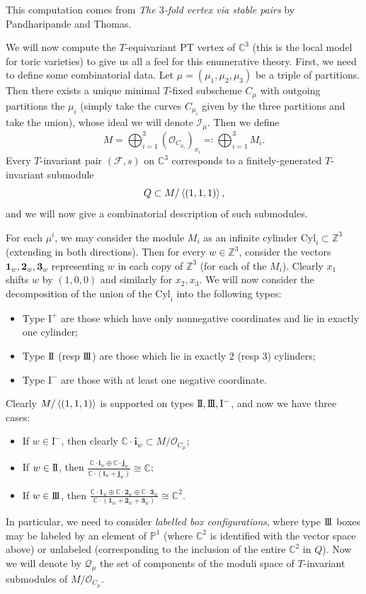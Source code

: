 \documentclass{amsart}
\theoremstyle{definition}
\theoremstyle{remark}
\theoremstyle{plain}
\theoremstyle{definition}
\theoremstyle{remark}
\newcommand{\C}{\mathbb{C}}
\newcommand{\Z}{\mathbb{Z}}
\renewcommand{\P}{\mathbb{P}}
\newcommand{\mc}[1]{\mathcal{#1}}
\newcommand{\mr}[1]{\mathrm{#1}}
\newcommand{\1}{\mathbf{1}}
\newcommand{\2}{\mathbf{2}}
\newcommand{\3}{\mathbf{3}}
\newcommand{\I}{\mathrm{I}}
\newcommand{\II}{\mr{I}\hspace{-1.3pt}\mr{I}}
\newcommand{\III}{\mr{I}\hspace{-1.3pt}\mr{I}\hspace{-1.3pt}\mr{I}}
\begin{document}
This computation comes from \textit{The $3$-fold vertex via stable pairs} by Pandharipande and Thomas.

We will now compute the $T$-equivariant PT vertex of $\C^3$ (this is the local model for toric varieties) to give us all a feel for this enumerative theory. First, we need to define some combinatorial data. Let $\mu = (\mu_1, \mu_2, \mu_3)$ be a triple of partitions. Then there exists a unique minimal $T$-fixed subscheme $C_{\mu}$ with outgoing partitions the $\mu_i$ (simply take the curves $C_{\mu_i}$ given by the three partitions and take the union), whose ideal we will denote $\mc{I}_{\mu}$. Then we define
\[ M = \bigoplus_{i=1}^3 {(\mc{O}_{C_{\mu_i}})}_{x_i} \eqqcolon \bigoplus_{i=1}^3 M_i. \]
Every $T$-invariant pair $(\mc{F}, s)$ on $\C^3$ corresponds to a finitely-generated $T$-invariant submodule
\[ Q \subset M/\ev{(1,1,1)}, \]
and we will now give a combinatorial description of such submodules.

For each $\mu^i$, we may consider the module $M_i$ as an infinite cylinder $\mr{Cyl}_i \subset \Z^3$ (extending in both directions). Then for every $w \in \Z^3$, consider the vectors $\1_w, \2_w, \3_w$ representing $w$ in each copy of $\Z^3$ (for each of the $M_i$). Clearly $x_1$ shifts $w$ by $(1,0,0)$ and similarly for $x_2, x_3$. We will now consider the decomposition of the union of the $\mr{Cyl}_i$ into the following types:
\begin{itemize}
    \item Type $\I^+$ are those which have only nonnegative coordinates and lie in exactly one cylinder;
    \item Type $\II$ (resp $\III$) are those which lie in exactly $2$ (resp $3$) cylinders;
    \item Type $\I^-$ are those with at least one negative coordinate.
\end{itemize}
Clearly $M / \ev{(1,1,1)}$ is supported on types $\II, \III, \I^-$, and now we have three cases:
\begin{itemize}
    \item If $w \in \I^-$, then clearly $\C \cdot \mathbf{i}_w \subset M/\mc{O}_{C_{\mu}}$;
    \item If $w \in \II$, then $\frac{\C \cdot \mathbf{i}_w \oplus \C \cdot \mathbf{j}_w}{\C \cdot (\mathbf{i}_w + \mathbf{j}_w)} \cong \C$;
    \item If $w \in \III$, then $\frac{\C \cdot \1_w \oplus \C \cdot \2_w \oplus \C \cdot \3_w}{\C \cdot (\1_w + \2_w + \3_w)} \cong \C^2$.
\end{itemize}
In particular, we need to consider \textit{labelled box configurations}, where type $\III$ boxes may be labeled by an element of $\P^1$ (where $\C^2$ is identified with the vector space above) or unlabeled (corresponding to the inclusion of the entire $\C^2$ in $Q$). Now we will denote by $\mc{Q}_{\mu}$ the set of components of the moduli space of $T$-invariant submodules of $M/\mc{O}_{C_{\mu}}$.
\end{document}
